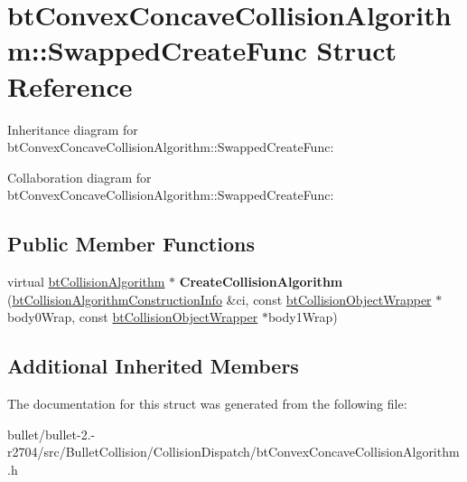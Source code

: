 \hypertarget{structbt_convex_concave_collision_algorithm_1_1_swapped_create_func}{\section{bt\+Convex\+Concave\+Collision\+Algorithm\+:\+:Swapped\+Create\+Func Struct Reference}
\label{structbt_convex_concave_collision_algorithm_1_1_swapped_create_func}
}


Inheritance diagram for bt\+Convex\+Concave\+Collision\+Algorithm\+:\+:Swapped\+Create\+Func\+:


Collaboration diagram for bt\+Convex\+Concave\+Collision\+Algorithm\+:\+:Swapped\+Create\+Func\+:
\subsection*{Public Member Functions}
\begin{DoxyCompactItemize}
\item 
\hypertarget{structbt_convex_concave_collision_algorithm_1_1_swapped_create_func_aa2126d3c63069571fb58ff4812322a87}{virtual \hyperlink{classbt_collision_algorithm}{bt\+Collision\+Algorithm} $\ast$ {\bfseries Create\+Collision\+Algorithm} (\hyperlink{structbt_collision_algorithm_construction_info}{bt\+Collision\+Algorithm\+Construction\+Info} \&ci, const \hyperlink{structbt_collision_object_wrapper}{bt\+Collision\+Object\+Wrapper} $\ast$body0\+Wrap, const \hyperlink{structbt_collision_object_wrapper}{bt\+Collision\+Object\+Wrapper} $\ast$body1\+Wrap)}\label{structbt_convex_concave_collision_algorithm_1_1_swapped_create_func_aa2126d3c63069571fb58ff4812322a87}

\end{DoxyCompactItemize}
\subsection*{Additional Inherited Members}


The documentation for this struct was generated from the following file\+:\begin{DoxyCompactItemize}
\item 
bullet/bullet-\/2.-\/r2704/src/\+Bullet\+Collision/\+Collision\+Dispatch/bt\+Convex\+Concave\+Collision\+Algorithm.\+h\end{DoxyCompactItemize}
